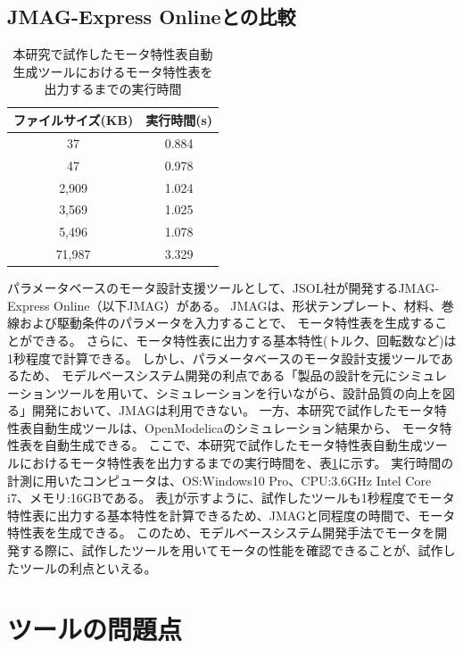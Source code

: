\subsection{JMAG-Express Onlineとの比較}
\begin{table}[t]
	\centering
	\caption{本研究で試作したモータ特性表自動生成ツールにおけるモータ特性表を出力するまでの実行時間}
	\begin{tabular}{|c|c|} \hline
	  ファイルサイズ(KB) & 実行時間(s)\\ \hline \hline
	  37 & 0.884 \\ \hline
	  47 &  0.978\\ \hline
	  2,909 &  1.024 \\ \hline
	  3,569 & 1.025 \\ \hline
	  5,496 &  1.078\\ \hline
	  71,987 &  3.329 \\ \hline
	\end{tabular}
	\label{tab:executionTime}
  \end{table}

パラメータベースのモータ設計支援ツールとして、JSOL社が開発するJMAG-Express Online（以下JMAG）がある\cite{jmag}。
JMAGは、形状テンプレート、材料、巻線および駆動条件のパラメータを入力することで、
モータ特性表を生成することができる。
さらに、モータ特性表に出力する基本特性(トルク、回転数など)は1秒程度で計算できる。
しかし、パラメータベースのモータ設計支援ツールであるため、
モデルベースシステム開発の利点である「製品の設計を元にシミュレーションツールを用いて、シミュレーションを行いながら、設計品質の向上を図る」\cite{ipa_2016}開発において、JMAGは利用できない。
一方、本研究で試作したモータ特性表自動生成ツールは、OpenModelicaのシミュレーション結果から、
モータ特性表を自動生成できる。
ここで、本研究で試作したモータ特性表自動生成ツールにおけるモータ特性表を出力するまでの実行時間を、表\ref{tab:executionTime}に示す。
実行時間の計測に用いたコンピュータは、OS:Windows10 Pro、CPU:3.6GHz Intel Core i7、メモリ:16GBである。
表\ref{tab:executionTime}が示すように、試作したツールも1秒程度でモータ特性表に出力する基本特性を計算できるため、JMAGと同程度の時間で、モータ特性表を生成できる。
このため、モデルベースシステム開発手法でモータを開発する際に、試作したツールを用いてモータの性能を確認できることが、試作したツールの利点といえる。

\section{ツールの問題点}

